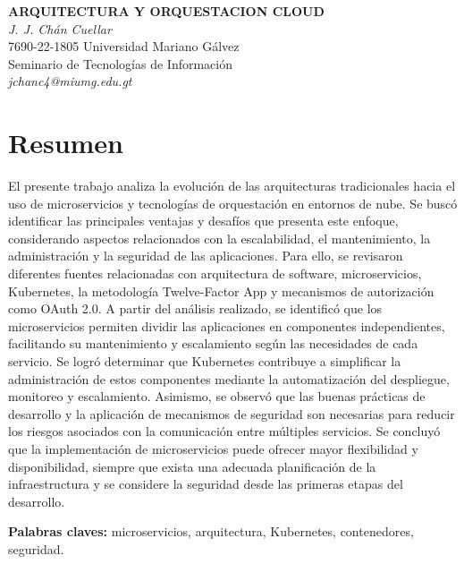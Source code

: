 \documentclass[12pt,letterpaper]{article}
\begin{document}
\begin{center}
    {\large\textbf{ARQUITECTURA Y ORQUESTACION CLOUD}} \\[1.5ex]
    \textit{J. J. Chán Cuellar } \\[1.5ex]
    7690-22-1805 \quad Universidad Mariano Gálvez \\[1.0ex]
    Seminario de Tecnologías de Información \\[1.0ex]
    \textit{jchanc4@miumg.edu.gt}
\end{center}

\section*{Resumen}
El presente trabajo analiza la evolución de las arquitecturas tradicionales hacia el uso de microservicios y tecnologías de orquestación en entornos de nube. Se buscó identificar las principales ventajas y desafíos que presenta este enfoque, considerando aspectos relacionados con la escalabilidad, el mantenimiento, la administración y la seguridad de las aplicaciones. Para ello, se revisaron diferentes fuentes relacionadas con arquitectura de software, microservicios, Kubernetes, la metodología Twelve-Factor App y mecanismos de autorización como OAuth 2.0. A partir del análisis realizado, se identificó que los microservicios permiten dividir las aplicaciones en componentes independientes, facilitando su mantenimiento y escalamiento según las necesidades de cada servicio. Se logró determinar que Kubernetes contribuye a simplificar la administración de estos componentes mediante la automatización del despliegue, monitoreo y escalamiento. Asimismo, se observó que las buenas prácticas de desarrollo y la aplicación de mecanismos de seguridad son necesarias para reducir los riesgos asociados con la comunicación entre múltiples servicios. Se concluyó que la implementación de microservicios puede ofrecer mayor flexibilidad y disponibilidad, siempre que exista una adecuada planificación de la infraestructura y se considere la seguridad desde las primeras etapas del desarrollo.

\vspace{1em}

\noindent\textbf{ Palabras claves:}  microservicios, arquitectura, Kubernetes, contenedores, seguridad.
\end{document}
